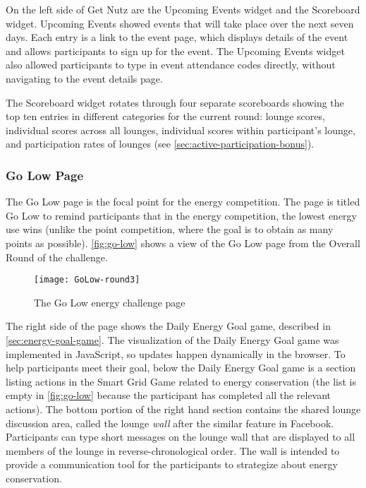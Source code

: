 On the left side of Get Nutz are the Upcoming Events widget and the Scoreboard widget. Upcoming Events showed events that will take place over the next seven days. Each entry is a link to the event page, which displays details of the event and allows participants to sign up for the event. The Upcoming Events widget also allowed participants to type in event attendance codes directly, without navigating to the event details page.

The Scoreboard widget rotates through four separate scoreboards showing the top ten entries in different categories for the current round: lounge scores, individual scores across all lounges, individual scores within participant's lounge, and participation rates of lounges (see \autoref{sec:active-participation-bonus}).


\subsubsection{Go Low Page}
\label{sec:go-low-page}

The Go Low page is the focal point for the energy competition. The page is titled Go Low to remind participants that in the energy competition, the lowest energy use wins (unlike the point competition, where the goal is to obtain as many points as possible). \autoref{fig:go-low} shows a view of the Go Low page from the Overall Round of the challenge.

\begin{figure}[htbp]
	\centering
		\texttt{[image: GoLow-round3]}
		\caption{The Go Low energy challenge page}
\label{fig:go-low}
\end{figure}

The right side of the page shows the Daily Energy Goal game, described in \autoref{sec:energy-goal-game}. The visualization of the Daily Energy Goal game was implemented in JavaScript, so updates happen dynamically in the browser. To help participants meet their goal, below the Daily Energy Goal game is a section listing actions in the Smart Grid Game related to energy conservation (the list is empty in \autoref{fig:go-low} because the participant has completed all the relevant actions). The bottom portion of the right hand section contains the shared lounge discussion area, called the lounge \emph{wall} after the similar feature in Facebook. Participants can type short messages on the lounge wall that are displayed to all members of the lounge in reverse-chronological order. The wall is intended to provide a communication tool for the participants to strategize about energy conservation.

